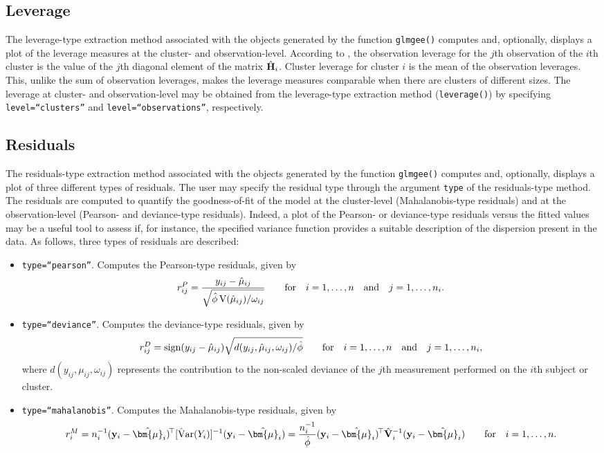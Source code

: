 \subsection{Leverage}
The leverage-type extraction method associated with the objects generated by the function {\tt glmgee()} computes and, optionally, displays a plot of the leverage measures at the cluster- and observation-level. According to \cite{PQ96,HP06}, the observation leverage for the $j$th observation of the $i$th cluster is the value of the $j$th diagonal element of the matrix $\hat{\bf H}_i$. Cluster leverage for cluster $i$ is the mean of the observation leverages. This, unlike the sum of observation leverages, makes the leverage measures comparable when there are clusters of different sizes. The leverage at cluster- and observation-level may be obtained from the leverage-type extraction method ({\tt leverage()}) by specifying {\tt level=``clusters''} and {\tt level=``observations''}, respectively.

\subsection{Residuals}
The residuals-type extraction method associated with the objects generated by the function {\tt glmgee()} computes and, optionally, displays a plot of three different types of residuals. The user may specify the residual type through the argument {\tt type} of the residuals-type method. The residuals are computed to quantify the goodness-of-fit of the model at the cluster-level (Mahalanobis-type residuals) and at the observation-level (Pearson- and deviance-type residuals). Indeed, a plot of the Pearson- or deviance-type residuals versus the fitted values may be a useful tool to assess if, for instance, the specified variance function provides a suitable description of the dispersion present in the data. As follows, three types of residuals are described:

\begin{itemize}
\item {\tt type=``pearson''}. Computes the Pearson-type residuals, given by
$$r^{P}_{ij}=\dfrac{y_{ij}-\hat{\mu}_{ij}}{\sqrt{\hat{\phi}\,{\rm V}(\hat{\mu}_{ij})/\omega_{ij}}}\qquad\text{for}\quad i=1,\ldots,n\quad\text{and}\quad j=1,\ldots,n_i.$$

\item {\tt type=``deviance''}. Computes the deviance-type residuals, given by
$$r^{D}_{ij}={\rm sign}(y_{ij}-\hat{\mu}_{ij})\sqrt{{d(y_{ij},\hat{\mu}_{ij},\omega_{ij})/\hat{\phi}}}\qquad\text{for}\quad i=1,\ldots,n\quad\text{and}\quad j=1,\ldots,n_i,$$
where $d(y_{ij},\mu_{ij},\omega_{ij})$ represents the contribution to the non-scaled deviance of the
$j$th measurement performed on the $i$th subject or cluster.

\item {\tt type=``mahalanobis''}. Computes the Mahalanobis-type residuals, given by
$$r^{M}_{i}=n_i^{-1}({\bf y}_i-\hat{\bm{\mu}}_i)^{\!\top}[{\rm \hat{V}ar}(Y_i)]^{-1}({\bf y}_i-\hat{\bm{\mu}}_i)=\dfrac{n_i^{-1}}{\hat{\phi}}({\bf y}_i-\hat{\bm{\mu}}_i)^{\!\top}\hat{\bf V}_i^{-1}({\bf y}_i-\hat{\bm{\mu}}_i)\qquad\text{for}\quad i=1,\ldots,n.$$
\end{itemize}

